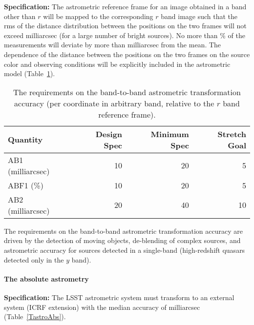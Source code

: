 \textbf{Specification:} The astrometric reference frame for an image obtained
in a band other than $r$ will be mapped to the corresponding $r$ band image
such that the rms of the distance distribution between the positions on the
two frames will not exceed
milliarcsec (for a large number of bright sources). No more than
\% of the measurements will deviate by more than
milliarcsec from the mean. The dependence of the distance between the
positions on the two frames on the source color and observing
conditions will be explicitly included in the astrometric model
(Table~\ref{Tastrob2b}).

\begin{table}[h]
\begin{tabular}{|l|r|r|r|}
\hline
Quantity   & Design Spec & Minimum Spec & Stretch Goal     \\
\hline
    AB1 (milliarcsec)  &    10      &        20    &        5         \\
    ABF1 (\%)          &    10      &        20    &        5         \\
    AB2 (milliarcsec)  &    20      &        40   &        10         \\
\hline

\end{tabular}
\caption{The requirements on the band-to-band astrometric transformation
accuracy (per coordinate in arbitrary band, relative to the $r$ band reference frame).}
\label{Tastrob2b}
\end{table}

The requirements on the band-to-band astrometric transformation accuracy
are driven by the detection of moving objects, de-blending of complex
sources, and astrometric accuracy for sources detected in a single-band
(\eg high-redshift quasars detected only in the $y$ band).


\paragraph{The absolute astrometry\\}

\textbf{Specification:} The LSST astrometric system must transform to an
external system (\eg ICRF extension) with the median accuracy of
milliarcsec (Table~\ref{TastroAbs}).

